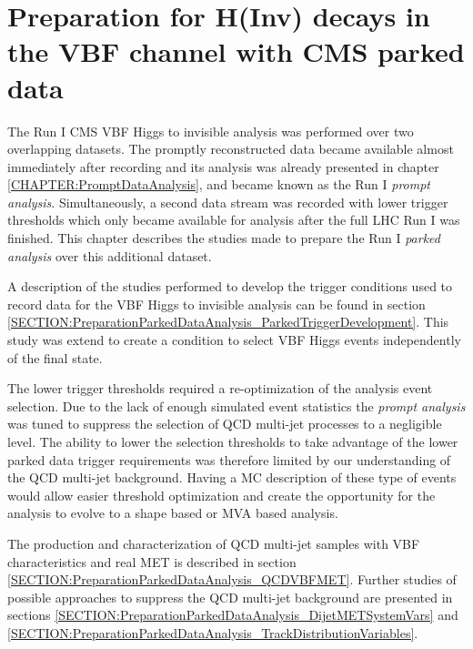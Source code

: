 \chapter{Preparation for H(Inv) decays in the VBF channel with CMS parked data}
\label{CHAPTER:PreparationParkedDataAnalysis}


The Run I \gls{CMS} \gls{VBF} Higgs to invisible analysis was performed over two overlapping datasets. The promptly reconstructed data became available almost immediately after recording and its analysis was already presented in chapter \ref{CHAPTER:PromptDataAnalysis}, and became known as the Run I \textit{prompt analysis}. Simultaneously, a second data stream was recorded with lower trigger thresholds which only became available for analysis after the full \gls{LHC} Run I was finished. This chapter describes the studies made to prepare the Run I \textit{parked analysis} over this additional dataset. 

A description of the studies performed to develop the trigger conditions used to record data for the \gls{VBF} Higgs to invisible analysis can be found in section \ref{SECTION:PreparationParkedDataAnalysis_ParkedTriggerDevelopment}. This study was extend to create a condition to select \gls{VBF} Higgs events independently of the final state.

The lower trigger thresholds required a re-optimization of the analysis event selection. Due to the lack of enough simulated event statistics the \textit{prompt analysis} was tuned to suppress the selection of \gls{QCD} multi-jet processes to a negligible level. The ability to lower the selection thresholds to take advantage of the lower parked data trigger requirements was therefore  limited by our understanding of the \gls{QCD} multi-jet background. Having a \gls{MC} description of these type of events would allow easier threshold optimization and create the opportunity for the analysis to evolve to a shape based or \gls{MVA} based analysis.

The production and characterization of \gls{QCD} multi-jet samples with \gls{VBF} characteristics and real \gls{MET} is described in section \ref{SECTION:PreparationParkedDataAnalysis_QCDVBFMET}. Further studies of possible approaches to suppress the \gls{QCD} multi-jet background are presented in sections \ref{SECTION:PreparationParkedDataAnalysis_DijetMETSystemVars} and \ref{SECTION:PreparationParkedDataAnalysis_TrackDistributionVariables}.

